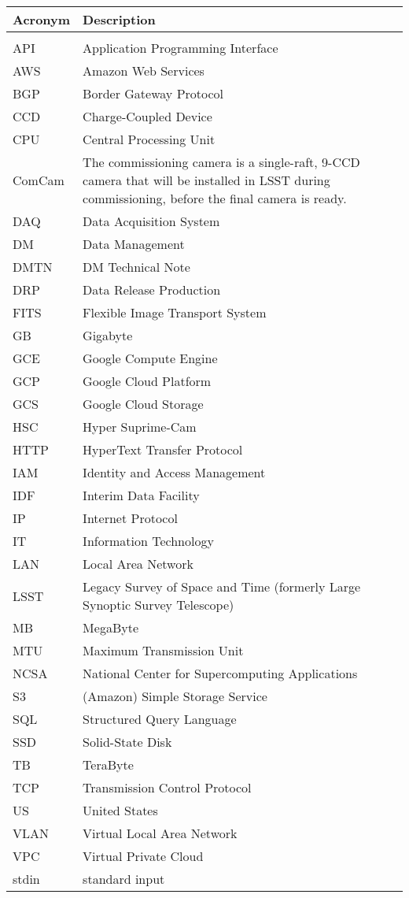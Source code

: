 \addtocounter{table}{-1}
\begin{longtable}{p{}p{}}\hline
\textbf{Acronym} & \textbf{Description}  \\\hline

 &  \\\hline
API & Application Programming Interface \\\hline
AWS & Amazon Web Services \\\hline
BGP &  Border Gateway Protocol \\\hline
CCD & Charge-Coupled Device \\\hline
CPU & Central Processing Unit \\\hline
ComCam & The commissioning camera is a single-raft, 9-CCD camera that will be installed in LSST during commissioning, before the final camera is ready. \\\hline
DAQ & Data Acquisition System \\\hline
DM & Data Management \\\hline
DMTN & DM Technical Note \\\hline
DRP & Data Release Production \\\hline
FITS & Flexible Image Transport System \\\hline
GB & Gigabyte \\\hline
GCE & Google Compute Engine \\\hline
GCP & Google Cloud Platform \\\hline
GCS & Google Cloud Storage \\\hline
HSC & Hyper Suprime-Cam \\\hline
HTTP & HyperText Transfer Protocol \\\hline
IAM & Identity and Access Management \\\hline
IDF & Interim Data Facility \\\hline
IP & Internet Protocol \\\hline
IT & Information Technology \\\hline
LAN & Local Area Network \\\hline
LSST & Legacy Survey of Space and Time (formerly Large Synoptic Survey Telescope) \\\hline
MB & MegaByte \\\hline
MTU & Maximum Transmission Unit \\\hline
NCSA & National Center for Supercomputing Applications \\\hline
S3 & (Amazon) Simple Storage Service  \\\hline
SQL & Structured Query Language \\\hline
SSD & Solid-State Disk \\\hline
TB & TeraByte \\\hline
TCP & Transmission Control Protocol \\\hline
US & United States \\\hline
VLAN &  Virtual Local Area Network \\\hline
VPC &  Virtual Private Cloud \\\hline
stdin & standard input \\\hline
\end{longtable}
